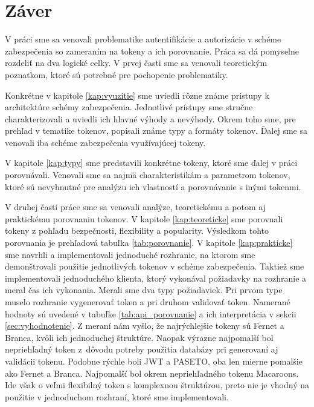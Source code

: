 \chapter*{Záver}  %

V práci sme sa venovali problematike autentifikácie a autorizácie v schéme zabezpečenia so zameraním na tokeny a ich porovnanie. Práca sa dá pomyselne rozdeliť na dva logické celky. V prvej časti sme sa venovali teoretickým poznatkom, ktoré sú potrebné pre pochopenie problematiky. 

Konkrétne v kapitole \ref{kap:vyuzitie} sme uviedli rôzne známe prístupy k architektúre schémy zabezpečenia. Jednotlivé prístupy sme stručne charakterizovali a uviedli ich hlavné výhody a nevýhody. Okrem toho sme, pre prehľad v tematike tokenov, popísali známe typy a formáty tokenov. Ďalej sme sa venovali iba schéme zabezpečenia využívajúcej tokeny.

V kapitole \ref{kap:typy} sme predstavili konkrétne tokeny, ktoré sme ďalej v práci porovnávali. Venovali sme sa najmä charakteristikám a parametrom tokenov, ktoré sú nevyhnutné pre analýzu ich vlastností a porovnávanie s inými tokenmi.

V druhej časti práce sme sa venovali analýze, teoretickému a potom aj praktickému porovnaniu tokenov. V kapitole \ref{kap:teoreticke} sme porovnali tokeny z pohľadu bezpečnosti, flexibility a popularity. Výsledkom tohto porovnania je prehľadová tabuľka \ref{tab:porovnanie}. V kapitole \ref{kap:prakticke} sme navrhli a implementovali jednoduché rozhranie, na ktorom sme demonštrovali použitie jednotlivých tokenov v schéme zabezpečenia. Taktiež sme implementovali jednoduchého klienta, ktorý vykonával požiadavky na rozhranie a meral čas ich vykonania. Merali sme dva typy požiadaviek. Pri prvom type muselo rozhranie vygenerovať token a pri druhom validovať token. Namerané hodnoty sú uvedené v tabuľke \ref{tab:api_porovnanie} a ich interpretácia v sekcii \ref{sec:vyhodnotenie}. Z meraní nám vyšlo, že najrýchlejšie tokeny sú Fernet a Branca, kvôli ich jednoduchej štruktúre. Naopak výrazne najpomalší bol nepriehľadný token z~dôvodu potreby použitia databázy pri generovaní aj validácii tokenu. Podobne rýchle boli JWT a PASETO, oba len mierne pomalšie ako Fernet a Branca. Najpomalší bol okrem nepriehľadného tokenu Macaroons. Ide však o veľmi flexibilný token s komplexnou štruktúrou, preto nie je vhodný na použitie v jednoduchom rozhraní, ktoré sme implementovali.


